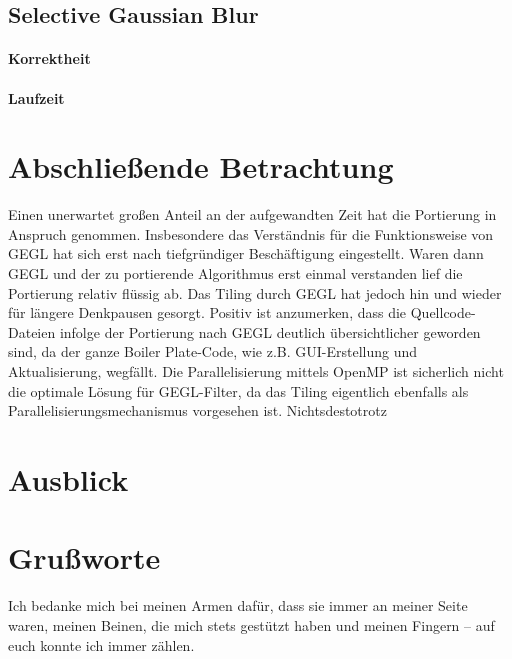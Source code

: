 \documentclass[10pt,a4paper]{article}
\begin{document}
\subsection{Selective Gaussian Blur}
\paragraph{Korrektheit}
\paragraph{Laufzeit}
\section{Abschließende Betrachtung}
Einen unerwartet großen Anteil an der aufgewandten Zeit hat die Portierung in Anspruch genommen. Insbesondere das Verständnis für die Funktionsweise von GEGL hat sich erst nach tiefgründiger Beschäftigung eingestellt. Waren dann GEGL und der zu portierende Algorithmus erst einmal verstanden lief die Portierung relativ flüssig ab. Das Tiling durch GEGL hat jedoch hin und wieder für längere Denkpausen gesorgt.
Positiv ist anzumerken, dass die Quellcode-Dateien infolge der Portierung nach GEGL deutlich übersichtlicher geworden sind, da der ganze Boiler Plate-Code, wie z.B. GUI-Erstellung und Aktualisierung, wegfällt.
Die Parallelisierung mittels OpenMP ist sicherlich nicht die optimale Lösung für GEGL-Filter, da das Tiling eigentlich ebenfalls als Parallelisierungsmechanismus vorgesehen ist. Nichtsdestotrotz 

\section{Ausblick}
\section{Grußworte}
Ich bedanke mich bei meinen Armen dafür, dass sie immer an meiner Seite waren, meinen Beinen, die mich stets gestützt haben und meinen Fingern -- auf euch konnte ich immer zählen.
%
\end{document}
